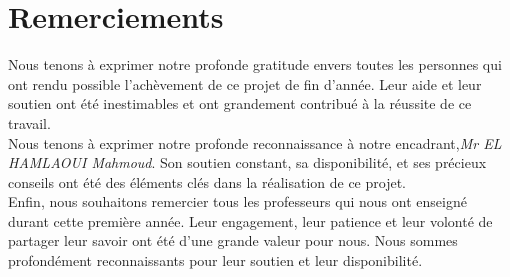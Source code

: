 \chapter*{Remerciements}

Nous tenons à exprimer notre profonde gratitude envers toutes
les personnes qui ont rendu possible l'achèvement de ce projet
de fin d'année. Leur aide et leur soutien ont été inestimables
et ont grandement contribué à la réussite de ce travail.  \\
  
Nous tenons à exprimer notre profonde reconnaissance à notre encadrant,\emph{Mr EL HAMLAOUI Mahmoud}. Son soutien constant,
sa disponibilité, et ses précieux conseils ont été des éléments clés dans la réalisation de ce projet. \\

Enfin, nous souhaitons remercier tous les professeurs qui nous ont enseigné durant cette première année. Leur engagement, leur patience et leur volonté de partager leur savoir ont été d'une grande valeur pour nous. Nous sommes profondément reconnaissants pour leur soutien et leur disponibilité.
\newpage

